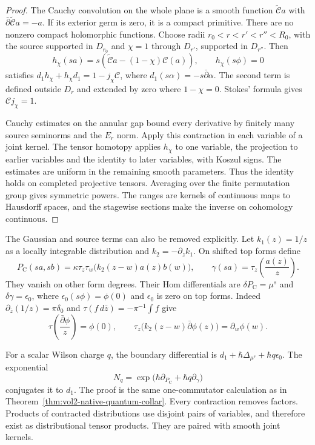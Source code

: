 \begin{proof}
The Cauchy convolution on the whole plane is a smooth function
\(\widetilde{\mathcal C}a\) with
\(\bar\partial\widetilde{\mathcal C}a=-a\).
If its exterior germ is zero, it is a compact primitive. There are no
nonzero compact holomorphic functions.
Choose radii
\(r_0<r<r'<r''<R_0\), with the source supported in \(D_{r_0}\) and
\(\chi=1\) through \(D_{r'}\), supported in \(D_{r''}\). Then
\[
 h_\chi(sa)=s\left(\widetilde{\mathcal C}a
                           -(1-\chi)\mathcal C(a)\right),
 \qquad h_\chi(s\phi)=0
\]
satisfies \(d_1h_\chi+h_\chi d_1=1-j_\chi\mathcal C\), where
\(d_1(s\alpha)=-s\bar\partial\alpha\).
The second term is defined outside \(D_r\) and extended by zero where
\(1-\chi=0\). Stokes' formula gives \(\mathcal Cj_\chi=1\).

Cauchy estimates on the annular gap bound every derivative by finitely
many source seminorms and the \(E_r\) norm. Apply this contraction in each
variable of a joint kernel. The tensor homotopy applies \(h_\chi\) to one
variable, the projection to earlier variables and the identity to later
variables, with Koszul signs. The estimates are uniform in the remaining
smooth parameters. Thus the identity holds on completed projective
tensors. Averaging over the finite permutation group gives symmetric
powers. The ranges are kernels of continuous maps to Hausdorff spaces,
and the stagewise sections make the inverse on cohomology continuous.
\end{proof}

The Gaussian and source terms can also be removed explicitly.
Let \(k_1(z)=1/z\) as a locally integrable distribution and
\(k_2=-\partial_zk_1\). On shifted top forms define
\[
 P_{\mathrm C}(sa,sb)=\kappa\tau_z\tau_w
                      \bigl(k_2(z-w)a(z)b(w)\bigr),
 \qquad \gamma(sa)=\tau_z\left(\frac{a(z)}z\right).
\]
They vanish on other form degrees. Their Hom differentials are
\(\delta P_{\mathrm C}=\mu^s\) and \(\delta\gamma=\epsilon_0\), where
\(\epsilon_0(s\phi)=\phi(0)\) and \(\epsilon_0\) is zero on top forms.
Indeed \(\partial_{\bar z}(1/z)=\pi\delta_0\) and
\(\tau(f\,d\bar z)=-\pi^{-1}\int f\) give
\[
 \tau\left(\frac{\bar\partial\phi}{z}\right)=\phi(0),
 \qquad
 \tau_z\bigl(k_2(z-w)\bar\partial\phi(z)\bigr)=\partial_w\phi(w).
\]

For a scalar Wilson charge \(q\), the boundary differential is
\(d_1+\hbar\Delta_{\mu^s}+\hbar q\epsilon_0\).
The exponential
\[
 N_q=\exp\bigl(\hbar\partial_{P_{\mathrm C}}
                       +\hbar q\partial_\gamma\bigr)
\]
conjugates it to \(d_1\). The proof is the same one-commutator calculation
as in Theorem~\ref{thm:vol2-native-quantum-collar}.
Every contraction removes factors. Products of contracted distributions
use disjoint pairs of variables, and therefore exist as distributional
tensor products. They are paired with smooth joint kernels.

